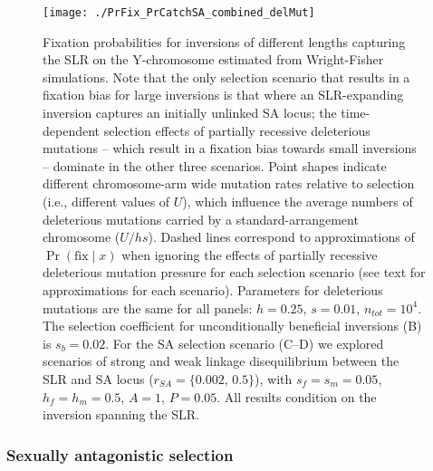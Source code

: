 \documentclass{article}[12pt]
\begin{document}
 \begin{figure}[H]
 \centering
 \texttt{[image: ./PrFix\_PrCatchSA\_combined\_delMut]}
 \caption[\captionsize]{Fixation probabilities for inversions of different lengths capturing the SLR on the Y-chromosome estimated from Wright-Fisher simulations. Note that the only selection scenario that results in a fixation bias for large inversions is that where an SLR-expanding inversion captures an initially unlinked SA locus; the time-dependent selection effects of partially recessive deleterious mutations -- which result in a fixation bias towards small inversions -- dominate in the other three scenarios. Point shapes indicate different chromosome-arm wide mutation rates relative to selection (i.e., different values of $U$), which influence the average numbers of deleterious mutations carried by a standard-arrangement chromosome ($U/hs$). Dashed lines correspond to approximations of $\Pr(\text{fix} \mid x)$ when ignoring the effects of partially recessive deleterious mutation pressure for each selection scenario (see text for approximations for each scenario). Parameters for deleterious mutations are the same for all panels: $h = 0.25$, $s = 0.01$, $n_{tot} = 10^4$. The selection coefficient for unconditionally beneficial inversions (B) is $s_b = 0.02$. For the SA selection scenario (C--D) we explored scenarios of strong and weak linkage disequilibrium between the SLR and SA locus ($r_{SA} = \{0.002,\, 0.5\}$), with $s_f = s_m = 0.05$, $h_f = h_m = 0.5$, $A = 1$, $P = 0.05$. All results condition on the inversion spanning the SLR.}
 \label{fig:PrFixFig}
 \end{figure}


\subsubsection*{Sexually antagonistic selection}\label{sec:SexAntag}
\end{document}
